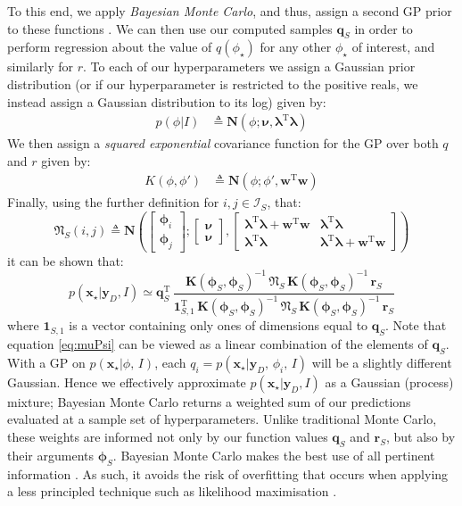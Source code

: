 \documentclass{acmtrans2m}
\newcommand{\p}[2]{p\!\left(\left.#1\right|#2\right)}
\newcommand{\vect}[1]{\boldsymbol{#1}}
\newcommand{\vx}{\vect{x}}
\newcommand{\vxst}{\vx_\star}
\newcommand{\vyD}{\vect{y}_D}
\newcommand{\vph}{\vect{\phi}}
\newcommand{\vphS}{\vph_S}
\newcommand{\phst}{\phi_\star}
\newcommand{\Nt}{\mat{\mathfrak{N}}_S}
\newcommand{\mat}[1]{\mathbf{#1}}
\newcommand{\N}[3]{\mat{N}\!\left(#1;#2,#3\right)}
\newcommand{\ones}[1]{\mat{1}_{#1}}
\newcommand{\tr}{\mathrm{T}}
\newcommand{\defequal}{\triangleq}
\begin{document}
To this end, we apply \emph{Bayesian Monte Carlo}, and thus, assign a second GP prior to these functions \cite{BZMonteCarlo}. We can then use our computed samples $\vect{q}_S$ in order to perform regression about the value of $q(\phst)$ for any other $\phst$ of interest, and similarly for $r$. To each of our hyperparameters we assign a Gaussian prior distribution (or if our hyperparameter is restricted to the positive reals, we instead assign a Gaussian distribution to its log) given by:
\begin{align}
 \p{\phi}{I} & \defequal \N{\phi}{\vect{\nu}}{\mat{\lambda}^\tr \mat{\lambda}} \label{eq:phiprior}
\end{align}
We then assign a {\em squared exponential} covariance function for the GP over both $q$ and $r$ given by:
\begin{align}
 K(\phi,\phi') & \defequal \N{\phi}{\phi'}{\mat{w}^\tr \mat{w}} \label{eq:BMCsqdexp}
\end{align}
Finally, using the further definition for $i,j \in \mathcal{I}_S$, that:
\small\begin{equation}
\Nt(i,j) \defequal \N{\begin{bmatrix} \vph_i \\ \vph_j \end{bmatrix}}{\begin{bmatrix} \vect{\nu} \\ \vect{\nu} \end{bmatrix}}{\begin{bmatrix}  \mat{\lambda}^\tr \mat{\lambda}+\mat{w}^\tr \mat{w} & \mat{\lambda}^\tr \mat{\lambda} \\ \mat{\lambda}^\tr \mat{\lambda} & \mat{\lambda}^\tr \mat{\lambda}+\mat{w}^\tr \mat{w}
\end{bmatrix}}
\end{equation}\normalsize
it can be shown that:
\small\begin{equation} \label{eq:muPsi}
\p{\vxst}{\vyD,I} \simeq \vect{q}_S^\tr\, \frac{\mat{K}(\vph_{S},\vph_{S})^{-1}\,\Nt\,\mat{K}(\vph_{S},\vph_{S})^{-1}\,\vect{r}_S}
{\ones{S,1}^\tr\,\mat{K}(\vph_{S},\vph_{S})^{-1}\,\Nt\,\mat{K}(\vph_{S},\vph_{S})^{-1}\,\vect{r}_S}
\end{equation}\normalsize
where $\ones{S,1}$ is a vector containing only ones of dimensions equal to $\vect{q}_S$. Note that equation \eqref{eq:muPsi} can be viewed as a linear combination of the elements of $\vect{q}_S$. With a GP on 
$\p{\vxst}{\phi,\,I}$, each $q_i = \p{\vxst}{\vyD,\,\phi_i,\,I}$ will be a slightly different Gaussian. Hence we effectively approximate $\p{\vxst}{\vyD,I}$ as a Gaussian (process) mixture; Bayesian Monte Carlo returns a weighted sum of our predictions evaluated at a sample set of hyperparameters. Unlike traditional Monte Carlo, these weights are informed not only by our function values $\vect{q}_S$ and $\vect{r}_S$, but also by their arguments $\vphS$. Bayesian Monte Carlo makes the best use of all pertinent information \cite{MCUnsound}. As such, it avoids the risk of overfitting that occurs when applying a less principled technique such as likelihood maximisation \cite{MKBook}.
\end{document}
